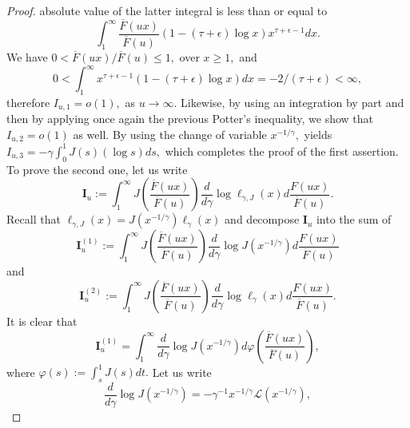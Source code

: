 \documentclass[12pt,reqno,openbib,runningheads,a4paper,portrait]{amsart}%
\begin{document}
\begin{proof}
absolute value of the latter integral is less than or equal to%
\[
\int_{1}^{\infty}\frac{\overline{F}\left(  ux\right)  }{\overline{F}\left(
u\right)  }\left(  1-\left(  \tau+\epsilon\right)  \log x\right)
x^{\tau+\epsilon-1}dx.
\]
We have $0<\overline{F}\left(  ux\right)  /\overline{F}\left(  u\right)
\leq1,$ over $x\geq1,$ and%
\[
0<\int_{1}^{\infty}x^{\tau+\epsilon-1}\left(  1-\left(  \tau+\epsilon\right)
\log x\right)  dx=-2/\left(  \tau+\epsilon\right)  <\infty,
\]
therefore $I_{u,1}=o\left(  1\right)  ,$ as $u\rightarrow\infty.$ Likewise, by
using an integration by part and then by applying once again the previous
Potter's inequality, we show that $I_{u,2}=o\left(  1\right)  $ as well. By
using the change of variable $x^{-1/\gamma},$ yields $I_{u,3}=-\gamma\int%
_{0}^{1}J\left(  s\right)  \left(  \log s\right)  ds,$ which completes the
proof of the first assertion. To prove the second one, let us write%
\[
\mathbf{I}_{u}:=%
{\displaystyle\int_{1}^{\infty}}
J\left(  \frac{\overline{F}\left(  ux\right)  }{\overline{F}\left(  u\right)
}\right)  \dfrac{d}{d\gamma}\log\ell_{\gamma,J}\left(  x\right)
d\frac{F\left(  ux\right)  }{\overline{F}\left(  u\right)  }.
\]
Recall that $\ell_{\gamma,J}\left(  x\right)  =J\left(  x^{-1/\gamma}\right)
\ell_{\gamma}\left(  x\right)  $ and decompose $\mathbf{I}_{u}$ into the sum
of
\[
\mathbf{I}_{u}^{\left(  1\right)  }:=%
{\displaystyle\int_{1}^{\infty}}
J\left(  \frac{\overline{F}\left(  ux\right)  }{\overline{F}\left(  u\right)
}\right)  \dfrac{d}{d\gamma}\log J\left(  x^{-1/\gamma}\right)  d\frac
{F\left(  ux\right)  }{\overline{F}\left(  u\right)  }%
\]
and%
\[
\mathbf{I}_{u}^{\left(  2\right)  }:=%
{\displaystyle\int_{1}^{\infty}}
J\left(  \frac{\overline{F}\left(  ux\right)  }{\overline{F}\left(  u\right)
}\right)  \dfrac{d}{d\gamma}\log\ell_{\gamma}\left(  x\right)  d\frac{F\left(
ux\right)  }{\overline{F}\left(  u\right)  }.
\]
It is clear that%
\[
\mathbf{I}_{u}^{\left(  1\right)  }=%
{\displaystyle\int_{1}^{\infty}}
\dfrac{d}{d\gamma}\log J\left(  x^{-1/\gamma}\right)  d\varphi\left(
\frac{\overline{F}\left(  ux\right)  }{\overline{F}\left(  u\right)  }\right)
,
\]
where $\varphi\left(  s\right)  :=\int_{s}^{1}J\left(  s\right)  dt.$ Let us
write
\[
\dfrac{d}{d\gamma}\log J\left(  x^{-1/\gamma}\right)  =-\gamma^{-1}%
x^{-1/\gamma}\mathcal{L}\left(  x^{-1/\gamma}\right)  ,
\]
\end{proof}
\end{document}
